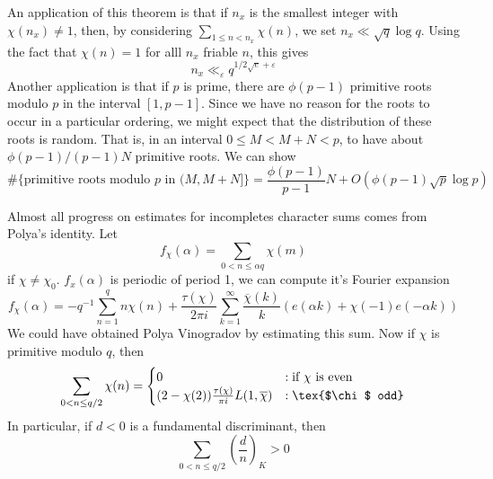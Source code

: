 An application of this theorem is that if $n_x$ is the smallest integer with $\chi(n_x) \neq 1$, then, by considering $\sum_{1 \leq n < n_x} \chi(n)$, we set $n_x \ll \sqrt{q} \log q$. Using the fact that $\chi(n) = 1$ for alll $n_x$ friable $n$, this gives
%
\[ n_x \ll_\varepsilon q^{1/2\sqrt{e} + \varepsilon} \]
%
Another application is that if $p$ is prime, there are $\phi(p-1)$ primitive roots modulo $p$ in the interval $[1,p-1]$. Since we have no reason for the roots to occur in a particular ordering, we might expect that the distribution of these roots is random. That is, in an interval $0 \leq M < M+N < p$, to have about $\phi(p-1)/(p-1)N$ primitive roots. We can show
%
\[ \# \{ \text{primitive roots modulo $p$ in $(M,M+N]$} \} = \frac{\phi(p-1)}{p-1} N + O \left( \phi(p-1) \sqrt{p} \log p \right) \]

Almost all progress on estimates for incompletes character sums comes from Polya's identity. Let
%
\[ f_\chi(\alpha) = \sum_{0 < n \leq \alpha q} \chi(m) \]
%
if $\chi \neq \chi_0$. $f_x(\alpha)$ is periodic of period 1, we can compute it's Fourier expansion
%
\[ f_\chi(\alpha) = -q^{-1} \sum_{n = 1}^q n \chi(n) + \frac{\tau(\chi)}{2 \pi i} \sum_{k = 1}^\infty \frac{\overline{\chi}(k)}{k} \left( e(\alpha k) + \chi(-1) e(-\alpha k) \right) \]
%
We could have obtained Polya Vinogradov by estimating this sum. Now if $\chi$ is primitive modulo $q$, then
%
\[ \sum_{0 < n \leq q/2} \chi(n) = \begin{cases} 0 & : \text{if $\chi$ is even} \\ (2 - \chi(2)) \frac{\tau(\chi)}{\pi i} L(1,\overline{\chi}) &: \tex{$\chi$ odd}\end{cases} \]
%
In particular, if $d < 0$ is a fundamental discriminant, then
%
\[ \sum_{0 < n \leq q/2} \left( \frac{d}{n} \right)_K > 0 \]
%


